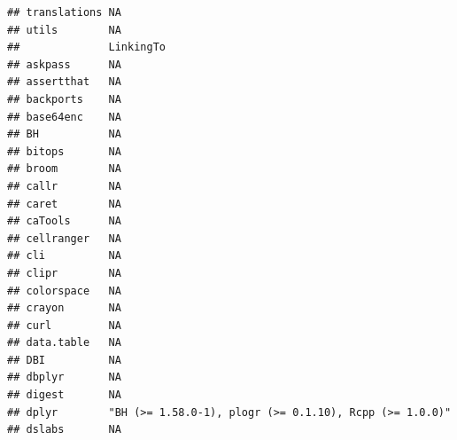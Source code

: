 \documentclass[]{article}
\begin{document}
\begin{verbatim}
## translations NA                                                                                                                                                                                                                                                                                                                                                                                                                                                                                    
## utils        NA                                                                                                                                                                                                                                                                                                                                                                                                                                                                                    
##              LinkingTo                                             
## askpass      NA                                                    
## assertthat   NA                                                    
## backports    NA                                                    
## base64enc    NA                                                    
## BH           NA                                                    
## bitops       NA                                                    
## broom        NA                                                    
## callr        NA                                                    
## caret        NA                                                    
## caTools      NA                                                    
## cellranger   NA                                                    
## cli          NA                                                    
## clipr        NA                                                    
## colorspace   NA                                                    
## crayon       NA                                                    
## curl         NA                                                    
## data.table   NA                                                    
## DBI          NA                                                    
## dbplyr       NA                                                    
## digest       NA                                                    
## dplyr        "BH (>= 1.58.0-1), plogr (>= 0.1.10), Rcpp (>= 1.0.0)"
## dslabs       NA                                                    

\end{verbatim}
\end{document}
